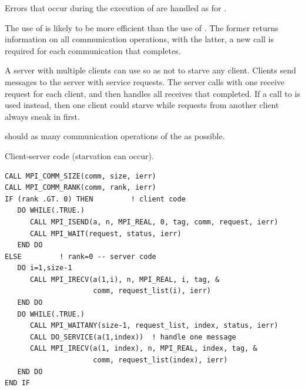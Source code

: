 Errors that occur during the execution of  are
handled as for \linebreak {}.

\begin{users}
The use of  is likely to be more efficient than the use
of . The former returns information on all
 communication operations, with the latter, a new call is required for
each communication that completes.

A server with multiple clients can use  so as not to
starve any client.  Clients send messages to the server with service
requests. The server calls  with one receive request
for each client, and then handles all receives that completed.
If a call to  is used instead, then one client
could starve while requests from another client always sneak in first.
\end{users}

\begin{implementors}
 should  as many
 communication operations of the  as possible.
\end{implementors}



\begin{example}
\label{pt2pt-exN}
%
%
Client-server code (starvation can occur).
\begin{lstlisting}[language={[MPI]Fortran}]
CALL MPI_COMM_SIZE(comm, size, ierr)
CALL MPI_COMM_RANK(comm, rank, ierr)
IF (rank .GT. 0) THEN         ! client code
   DO WHILE(.TRUE.)
      CALL MPI_ISEND(a, n, MPI_REAL, 0, tag, comm, request, ierr)
      CALL MPI_WAIT(request, status, ierr)
   END DO
ELSE         ! rank=0 -- server code
   DO i=1,size-1
      CALL MPI_IRECV(a(1,i), n, MPI_REAL, i, tag, &
                     comm, request_list(i), ierr)
   END DO
   DO WHILE(.TRUE.)
      CALL MPI_WAITANY(size-1, request_list, index, status, ierr)
      CALL DO_SERVICE(a(1,index))  ! handle one message
      CALL MPI_IRECV(a(1, index), n, MPI_REAL, index, tag, &
                     comm, request_list(index), ierr)
   END DO
END IF
\end{lstlisting}
\end{example}
\label{page:pt2pt-waitany}


